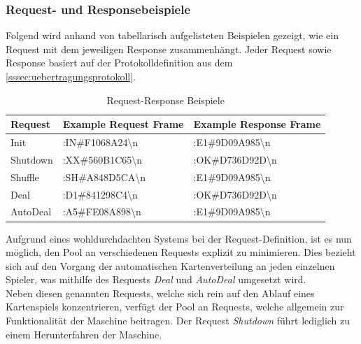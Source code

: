\subsubsection{Request- und Responsebeispiele}
Folgend wird anhand von tabellarisch aufgelisteten Beispielen gezeigt, wie ein Request mit dem jeweiligen Response zusammenhängt.
Jeder Request sowie Response basiert auf der Protokolldefinition aus dem \autoref{sssec:uebertragungsprotokoll}.
\begin{table}[]
    \centering
    \begin{tabular}{|l|l|l|}
        \hline
        {\color[HTML]{333333} \textbf{Request}} & {\color[HTML]{333333} \textbf{Example Request Frame}} & {\color[HTML]{333333} \textbf{Example Response Frame}} \\ \hline
        {\color[HTML]{333333} Init}             & {\color[HTML]{333333} :IN\#F1068A24\textbackslash{}n} & {\color[HTML]{333333} :E1\#9D09A985\textbackslash{}n}  \\ \hline
        {\color[HTML]{333333} Shutdown}         & {\color[HTML]{333333} :XX\#560B1C65\textbackslash{}n} & {\color[HTML]{333333} :OK\#D736D92D\textbackslash{}n}  \\ \hline
        {\color[HTML]{333333} Shuffle}          & {\color[HTML]{333333} :SH\#A848D5CA\textbackslash{}n} & {\color[HTML]{333333} :E1\#9D09A985\textbackslash{}n}  \\ \hline
        {\color[HTML]{333333} Deal}             & {\color[HTML]{333333} :D1\#841298C4\textbackslash{}n} & {\color[HTML]{333333} :OK\#D736D92D\textbackslash{}n}  \\ \hline
        {\color[HTML]{333333} AutoDeal}         & {\color[HTML]{333333} :A5\#FE08A898\textbackslash{}n} & {\color[HTML]{333333} :E1\#9D09A985\textbackslash{}n}  \\ \hline
    \end{tabular}
    \caption{Request-Response Beispiele}
\end{table}
Aufgrund eines wohldurchdachten Systems bei der Request-Definition, ist es nun möglich, den Pool an verschiedenen Requests explizit zu minimieren.
Dies bezieht sich auf den Vorgang der automatischen Kartenverteilung an jeden einzelnen Spieler, was mithilfe des Requests \textit{Deal} und \textit{AutoDeal} umgesetzt wird.\\
Neben diesen genannten Requests, welche sich rein auf den Ablauf eines Kartenspiels konzentrieren, verfügt der Pool an Requests, welche allgemein zur Funktionalität der Maschine beitragen.
Der Request \textit{Shutdown} führt lediglich zu einem Herunterfahren der Maschine.
